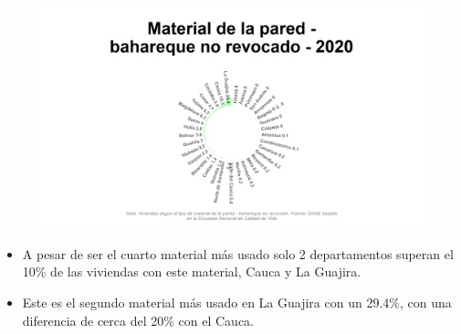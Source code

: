    \begin{figure}[H]
        \caption[Viviendas con pared de bahareque no revocado por departamentos para 2020 ]{\label{pared_bahareque_no_revo_dptos} }
        \begin{center}
        \includegraphics[width=\textwidth,keepaspectratio]{img/var_152_static.png}
        \end{center}
    \end{figure}
            \begin{itemize}
                    \item A pesar de ser el cuarto material más usado solo 2 departamentos superan el 10\% de las viviendas con este material, Cauca y La Guajira.
                    \item Este es el segundo material más usado en La Guajira con un 29.4\%, con una diferencia de cerca del 20\% con el Cauca.
                    \end{itemize}

